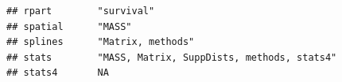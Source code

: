 \documentclass[]{article}
\begin{document}
\begin{verbatim}
## rpart        "survival"                                                                                                                                                                                                                                                                                                                                                                                                                                                                                                                                                                                
## spatial      "MASS"                                                                                                                                                                                                                                                                                                                                                                                                                                                                                                                                                                                    
## splines      "Matrix, methods"                                                                                                                                                                                                                                                                                                                                                                                                                                                                                                                                                                         
## stats        "MASS, Matrix, SuppDists, methods, stats4"                                                                                                                                                                                                                                                                                                                                                                                                                                                                                                                                                
## stats4       NA                                                                                                                                                                                                                                                                                                                                                                                                                                                                                                                                                                                        

\end{verbatim}
\end{document}
